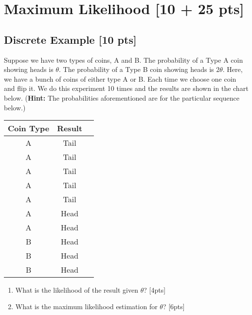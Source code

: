 \documentclass{article}
\begin{document}
\section{Maximum Likelihood [10 + 25 pts]}
\subsection{Discrete Example [10 pts]}
Suppose we have two types of coins, A and B. The probability of a Type A coin showing heads is $\theta$.  The probability of a Type B coin showing heads is $2\theta$. Here, we have a bunch of coins of either type A or B. Each time we choose one coin and flip it. We do this experiment 10 times and the results are shown in the chart below. (\textbf{Hint:} The probabilities aforementioned are for the particular sequence below.)
\\


\begin{center}
\begin{tabular}{ccc}
\hline
Coin Type & Result\\
\hline
A& Tail\\
A& Tail\\
A& Tail\\
A& Tail\\
A& Tail\\
A& Head\\
A& Head\\
B& Head\\
B& Head\\
B& Head\\
\hline
\end{tabular}
\end{center}

\begin{enumerate}[label=(\alph*)]
\item What is the likelihood of the result given $\theta$? [4pts]


\item What is the maximum likelihood estimation for $\theta$? [6pts]\\\\

\end{enumerate}
\end{document}
